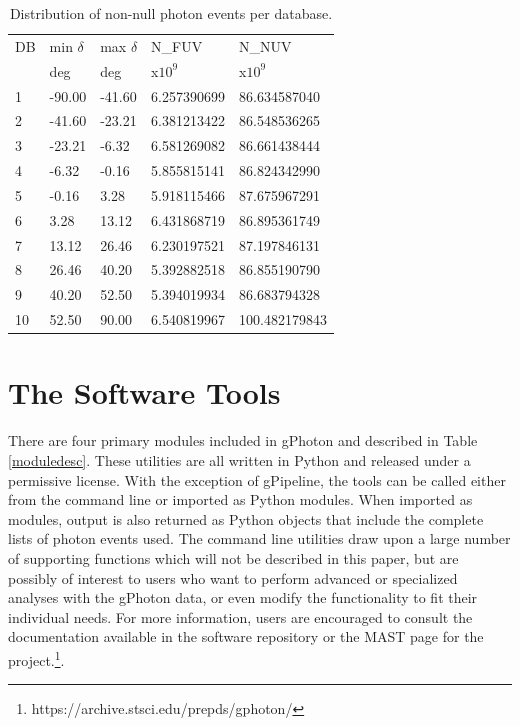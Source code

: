 \documentclass[preprint]{aastex}
\begin{document}
\begin{table}[h]
\begin{tabularx}{0.55\textwidth}{lllll}
\hline\hline
DB & min $\delta$ & max $\delta$ & N\_FUV & N\_NUV\\
   & deg          & deg          & x$10^9$ & x$10^9$\\
\hline
1 & -90.00 & -41.60 &   6.257390699 &  86.634587040\\
2 & -41.60 & -23.21 &   6.381213422 &  86.548536265\\
3 & -23.21 &  -6.32 &   6.581269082 &  86.661438444\\
4 &  -6.32 &  -0.16 &   5.855815141 &  86.824342990\\
5 &  -0.16 &   3.28 &   5.918115466 &  87.675967291\\
6 &   3.28 &  13.12 &   6.431868719 &  86.895361749\\
7 &  13.12 &  26.46 &   6.230197521 &  87.197846131\\
8 &  26.46 &  40.20 &   5.392882518 &  86.855190790\\
9 &  40.20 &  52.50 &   5.394019934 &  86.683794328\\
10 &  52.50 &  90.00 &   6.540819967 & 100.482179843\\
\hline
\end{tabularx}
\caption{Distribution of non-null photon events per database.\label{dbcounts}}
\end{table}

\section{The Software Tools}
\label{softwaretools}
There are four primary modules included in gPhoton and described in Table \ref{moduledesc}. These utilities are all written in Python and released under a permissive license. With the exception of gPipeline, the tools can be called either from the command line or imported as Python modules. When imported as modules, output is also returned as Python objects that include the complete lists of photon events used. The command line utilities draw upon a large number of supporting functions which will not be described in this paper, but are possibly of interest to users who want to perform advanced or specialized analyses with the gPhoton data, or even modify the functionality to fit their individual needs. For more information, users are encouraged to consult the documentation available in the software repository or the MAST page for the project.\footnote{https://archive.stsci.edu/prepds/gphoton/}.
\end{document}
